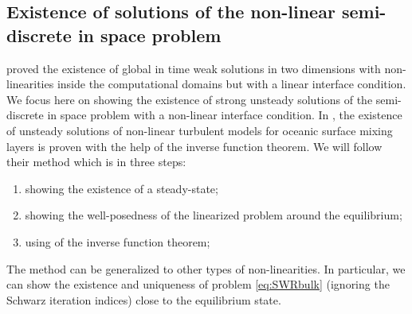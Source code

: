 \subsection{Existence of solutions of the
non-linear semi-discrete in space problem}
\label{sec:OASchwarz_wellPosedness}
\cite{lions_mathematical_1995} proved the existence
of global in time weak solutions in
two dimensions with non-linearities inside the
computational domains but with a linear
interface condition.
We focus here on showing the existence of strong
unsteady solutions of the semi-discrete in space
problem with a non-linear interface condition.
In \citep{chacon-rebollo_existence_2014},
the existence of unsteady solutions of
non-linear turbulent models for oceanic surface mixing layers is
proven with the help of the inverse function theorem.
We will follow their method which is in three steps:
\begin{enumerate}
	\item showing the existence of a steady-state;
	\item showing the well-posedness of the linearized problem
	around the equilibrium;
	\item using of the inverse function theorem;
\end{enumerate}
The method can be generalized to other types of
non-linearities. In particular, we can show the existence and
uniqueness of problem \eqref{eq:SWRbulk}
(ignoring the Schwarz iteration indices) close to the
equilibrium state.
